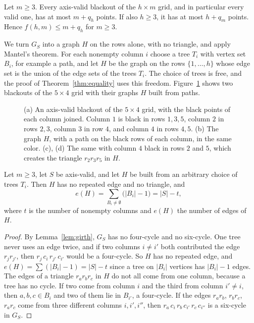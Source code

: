 \begin{theorem}\label{thm:rowbound}
Let $m\ge3$. Every axis-valid blackout of the $h\times m$ grid, and in particular every valid one, has at most $m+q_h$ points. If also $h\ge3$, it has at most $h+q_m$ points. Hence $f(h,m)\le m+q_h$ for $m\ge3$.
\end{theorem}

We turn $G_S$ into a graph $H$ on the rows alone, with no triangle, and apply Mantel's theorem. For each nonempty column $i$ choose a tree $T_i$ with vertex set $B_i$, for example a path, and let $H$ be the graph on the rows $\{1,\dots,h\}$ whose edge set is the union of the edge sets of the trees $T_i$. The choice of trees is free, and the proof of Theorem~\ref{thm:equality} uses this freedom. Figure~\ref{fig:rowbound} shows two blackouts of the $5\times4$ grid with their graphs $H$ built from paths.

\begin{figure}[t]
\centering

\caption{(a) An axis-valid blackout of the $5\times4$ grid, with the black points of each column joined. Column $1$ is black in rows $1,3,5$, column $2$ in rows $2,3$, column $3$ in row $4$, and column $4$ in rows $4,5$. (b) The graph $H$, with a path on the black rows of each column, in the same color. (c), (d) The same with column $4$ black in rows $2$ and $5$, which creates the triangle $r_2r_3r_5$ in $H$.}
\label{fig:rowbound}
\end{figure}

\begin{lemma}\label{lem:H}
Let $m\ge3$, let $S$ be axis-valid, and let $H$ be built from an arbitrary choice of trees $T_i$. Then $H$ has no repeated edge and no triangle, and
\[
e(H)=\sum_{B_i\ne\emptyset}\bigl(|B_i|-1\bigr)=|S|-t,
\]
where $t$ is the number of nonempty columns and $e(H)$ the number of edges of $H$.
\end{lemma}

\begin{proof}
By Lemma~\ref{lem:girth}, $G_S$ has no four-cycle and no six-cycle. One tree never uses an edge twice, and if two columns $i\ne i'$ both contributed the edge $r_jr_{j'}$, then $r_j\,c_i\,r_{j'}\,c_{i'}$ would be a four-cycle. So $H$ has no repeated edge, and $e(H)=\sum(|B_i|-1)=|S|-t$ since a tree on $|B_i|$ vertices has $|B_i|-1$ edges. The edges of a triangle $r_ar_br_c$ in $H$ do not all come from one column, because a tree has no cycle. If two come from column $i$ and the third from column $i'\ne i$, then $a,b,c\in B_i$ and two of them lie in $B_{i'}$, a four-cycle. If the edges $r_ar_b$, $r_br_c$, $r_ar_c$ come from three different columns $i,i',i''$, then $r_a\,c_i\,r_b\,c_{i'}\,r_c\,c_{i''}$ is a six-cycle in $G_S$.
\end{proof}

